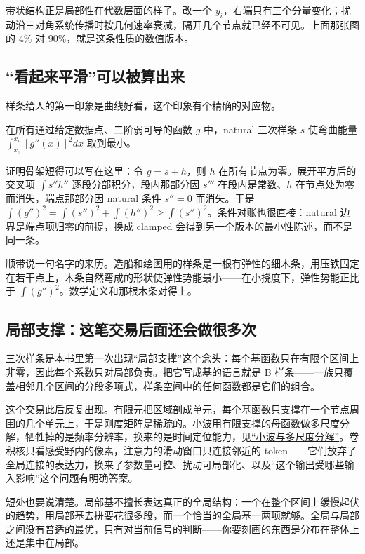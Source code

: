 带状结构正是局部性在代数层面的样子。改一个 \(y_i\)，右端只有三个分量变化；扰动沿三对角系统传播时按几何速率衰减，隔开几个节点就已经不可见。上面那张图的 \(4\%\) 对 \(90\%\)，就是这条性质的数值版本。

\subsection{``看起来平滑''可以被算出来}

样条给人的第一印象是曲线好看，这个印象有个精确的对应物。

\begin{theorem}
在所有通过给定数据点、二阶弱可导的函数 \(g\) 中，natural 三次样条 \(s\) 使弯曲能量 \(\int_{x_0}^{x_n}[g''(x)]^2dx\) 取到最小。
\end{theorem}

证明骨架短得可以写在这里：令 \(g=s+h\)，则 \(h\) 在所有节点为零。展开平方后的交叉项 \(\int s''h''\) 逐段分部积分，段内那部分因 \(s'''\) 在段内是常数、\(h\) 在节点处为零而消失，端点那部分因 natural 条件 \(s''=0\) 而消失。于是 \(\int(g'')^2=\int(s'')^2+\int(h'')^2\ge\int(s'')^2\)。条件对账也很直接：natural 边界是端点项归零的前提，换成 clamped 会得到另一个版本的最小性陈述，而不是同一条。

顺带说一句名字的来历。造船和绘图用的样条是一根有弹性的细木条，用压铁固定在若干点上，木条自然弯成的形状使弹性势能最小——在小挠度下，弹性势能正比于 \(\int(g'')^2\)。数学定义和那根木条对得上。

\subsection{局部支撑：这笔交易后面还会做很多次}

三次样条是本书里第一次出现``局部支撑''这个念头：每个基函数只在有限个区间上非零，因此每个系数只对局部负责。把它写成基的语言就是 B 样条——一族只覆盖相邻几个区间的分段多项式，样条空间中的任何函数都是它们的组合。

这个交易此后反复出现。有限元把区域剖成单元，每个基函数只支撑在一个节点周围的几个单元上，于是刚度矩阵是稀疏的。小波用有限支撑的母函数做多尺度分解，牺牲掉的是频率分辨率，换来的是时间定位能力，见\hyperref[sec:08-Numerical-Analysis/08-Fourier-and-Spectral-Methods/06]{``小波与多尺度分解''}。卷积核只看感受野内的像素，注意力的滑动窗口只连接邻近的 token——它们放弃了全局连接的表达力，换来了参数量可控、扰动可局部化、以及``这个输出受哪些输入影响''这个问题有明确答案。

短处也要说清楚。局部基不擅长表达真正的全局结构：一个在整个区间上缓慢起伏的趋势，用局部基去拼要花很多段，而一个恰当的全局基一两项就够。全局与局部之间没有普适的最优，只有对当前信号的判断——你要刻画的东西是分布在整体上还是集中在局部。

